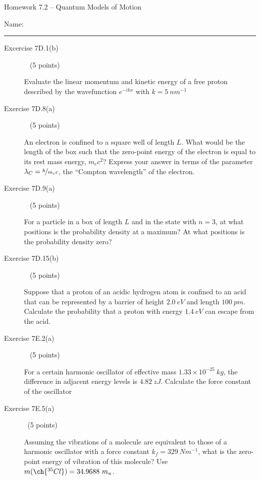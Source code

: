 \documentclass[10pt, letterpaper]{memoir}
\begin{document}
\begin{center}
	{\large Homework 7.2 -- Quantum Models of Motion}
\end{center}

Name: \rule[-.1mm]{15em}{0.1pt}

\begin{description}
	\item [Excercise 7D.1(b)] ~ (5 points)
	
	Evaluate the linear momentum and kinetic energy of a free proton described by the wavefunction $e^{-ikx}$ with $k=5~nm^{-1}$
	
	\vspace{12em}
	\item [Exercise 7D.8(a)] ~ (5 points)
	
	An electron is confined to a square well of length $L$. What would be the length of the box such that the zero-point energy of the electron is equal to its rest mass energy, $m_ec^2$? Express your answer in terms of the parameter $\lambda_C=\nicefrac{h}{m_ec}$, the ``Compton wavelength'' of the electron.
	
	\vspace{20em}
	\item [Exercise 7D.9(a)] ~ (5 points)
	
	For a particle in a box of length $L$  and in the state with $n=3$, at what positions is the probability density at a maximum? At what positions is the probability density zero?
	
	\vspace{13em}	
	\item [Exercise 7D.15(b)] ~ (5 points)
	
	Suppose that a proton of an acidic hydrogen atom is confined to an acid that can be represented by a barrier of height $2.0~eV$ and length $100~pm$. Calculate the probability that a proton with energy $1.4~eV$ can escape from the acid.

	\vspace{14em}	
	\item [Exercise 7E.2(a)] ~ (5 points)
	
	For a certain harmonic oscillator of effective mass $1.33\times10^{-25}~kg$, the difference in adjacent energy levels is $4.82~zJ$. Calculate the force constant of the oscillator
	
	\vspace{12em}
	\item [Exercise 7E.5(a)] ~(5 points)
	
	Assuming the vibrations of a  molecule are equivalent to those of a harmonic oscillator with a force constant $k_f=329~Nm^{-1}$, what is the zero-point energy of vibration of this molecule? Use $m(\ch{^{35}Cl})=34.9688~m_u$.
	

\end{description}
\end{document}

